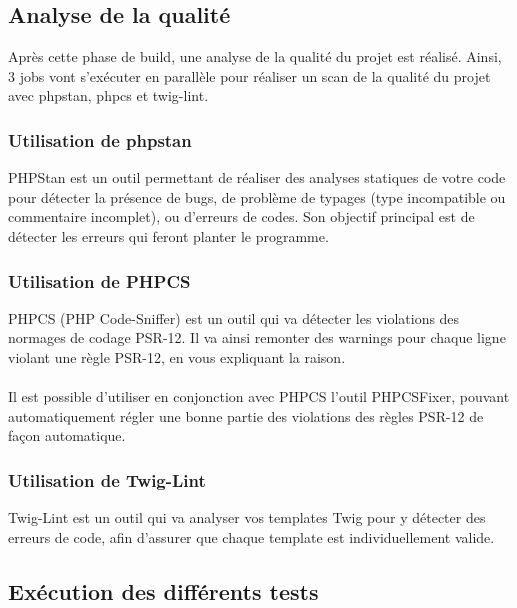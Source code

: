 \documentclass{article}
\begin{document}
        \subsection{Analyse de la qualité}

            Après cette phase de build, une analyse de la qualité du projet est réalisé. Ainsi, 3 jobs vont s'exécuter en parallèle pour réaliser un scan de la qualité du projet avec phpstan, phpcs et twig-lint.

            \subsubsection{Utilisation de phpstan}

                PHPStan est un outil permettant de réaliser des analyses statiques de votre code pour détecter la présence de bugs, de problème de typages (type incompatible ou commentaire incomplet), ou d'erreurs de codes. Son objectif principal est de détecter les erreurs qui feront planter le programme.

            \subsubsection{Utilisation de PHPCS}

                PHPCS (PHP Code-Sniffer) est un outil qui va détecter les violations des normages de codage PSR-12. Il va ainsi remonter des warnings pour chaque ligne violant une règle PSR-12, en vous expliquant la raison.\\
                \\
                \indent Il est possible d'utiliser en conjonction avec PHPCS l'outil PHPCSFixer, pouvant automatiquement régler une bonne partie des violations des règles PSR-12 de façon automatique.

            \subsubsection{Utilisation de Twig-Lint}

                Twig-Lint est un outil qui va analyser vos templates Twig pour y détecter des erreurs de code, afin d'assurer que chaque template est individuellement valide.

        \subsection{Exécution des différents tests}
\end{document}
